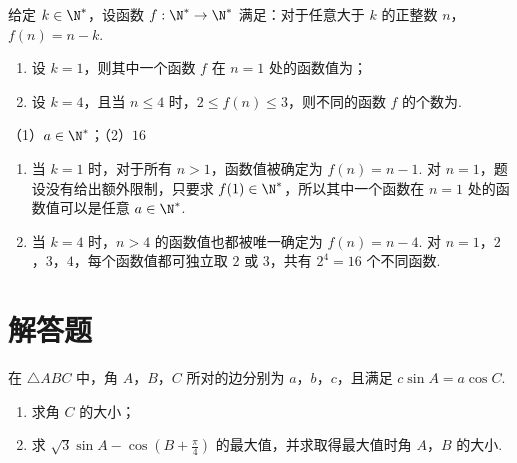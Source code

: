 \begin{problem}
给定 \(k \in \N^*\)，设函数 \(f: \N^* \to \N^*\) 满足：对于任意大于 \(k\) 的正整数 \(n\)，\(f(n) = n - k\).
\begin{enumerate}
\item 设 \(k = 1\)，则其中一个函数 \(f\) 在 \(n = 1\) 处的函数值为\fillinblank{}；
\item 设 \(k = 4\)，且当 \(n \leqslant 4\) 时，\(2 \leqslant f(n) \leqslant 3\)，则不同的函数 \(f\) 的个数为\fillinblank{}.
\end{enumerate}
\end{problem}

\begin{answer}
（1）\(a\in\N^*\)；（2）\(16\)
\end{answer}

\begin{solution}
\begin{enumerate}
\item 当 \(k=1\) 时，对于所有 \(n>1\)，函数值被确定为 \(f(n)=n-1\). 对 \(n=1\)，题设没有给出额外限制，只要求 \(f(1)\in\N^*\)，所以其中一个函数在 \(n=1\) 处的函数值可以是任意 \(a\in\N^*\).
\item 当 \(k=4\) 时，\(n>4\) 的函数值也都被唯一确定为 \(f(n)=n-4\). 对 \(n=1\)，\(2\)，\(3\)，\(4\)，每个函数值都可独立取 \(2\) 或 \(3\)，共有
\(2^4=16\) 个不同函数.
\end{enumerate}
\end{solution}

\section{解答题}

\begin{problem}
在 \(\triangle ABC\) 中，角 \(A\)，\(B\)，\(C\) 所对的边分别为 \(a\)，\(b\)，\(c\)，且满足 \(c \sin A = a \cos C\).
\begin{enumerate}
\item 求角 \(C\) 的大小；
\item 求 \( \sqrt{3}\sin A - \cos\left(B + \frac{\pi}{4}\right) \) 的最大值，并求取得最大值时角 \(A\)，\(B\) 的大小.
\end{enumerate}
\end{problem}

